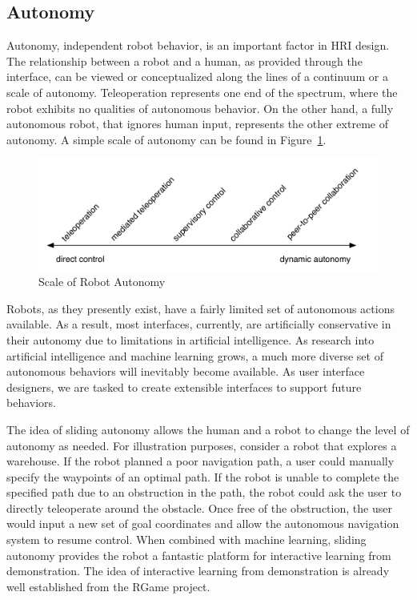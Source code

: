 
\subsection{Autonomy}

Autonomy, independent robot behavior, is an important factor in HRI design. The relationship between a robot and a human, as provided through the interface, can be viewed or conceptualized along the lines of a continuum or a scale of autonomy. Teleoperation represents one end of the spectrum, where the robot exhibits no qualities of autonomous behavior. On the other hand, a fully autonomous robot, that ignores human input, represents the other extreme of autonomy. A simple scale of autonomy can be found in Figure~\ref{fig:autonomy}. \cite{Goodrich_Survey}


\begin{figure}[ht]
\begin{center}
\includegraphics[width=5in]{images/autonomy.pdf}
\caption{Scale of Robot Autonomy\label{fig:autonomy}}
\end{center}
\end{figure}

Robots, as they presently exist, have a fairly limited set of autonomous actions available. As a result, most interfaces, currently, are artificially conservative in their autonomy due to limitations in artificial intelligence. As research into artificial intelligence and machine learning grows, a much more diverse set of autonomous behaviors will inevitably become available. As user interface designers, we are tasked to create extensible interfaces to support future behaviors.

The idea of sliding autonomy allows the human and a robot to change the level of autonomy as needed. For illustration purposes, consider a robot that explores a warehouse. If the robot planned a poor navigation path, a user could manually specify the waypoints of an optimal path. If the robot is unable to complete the specified path due to an obstruction in the path, the robot could ask the user to directly teleoperate around the obstacle. Once free of the obstruction, the user would input a new set of goal coordinates and allow the autonomous navigation system to resume control. When combined with machine learning, sliding autonomy provides the robot a fantastic platform for interactive learning from demonstration. The idea of interactive learning from demonstration is already well established from the RGame project.

